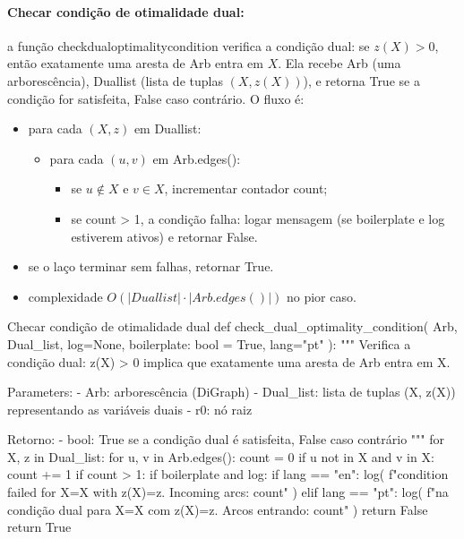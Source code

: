 \documentclass[12pt,a4paper]{article}
\def\texttt#1{#1}%
\def\_{}%
\begin{document}
\paragraph{Checar condição de otimalidade dual:}
    a função \texttt{check\_dual\_optimality\_condition} verifica a condição dual: se \(z(X)>0\), então exatamente uma aresta de \texttt{Arb} entra em \(X\). Ela recebe \texttt{Arb} (uma arborescência), \texttt{Dual\_list} (lista de tuplas \((X,z(X))\)), e retorna True se a condição for satisfeita, False caso contrário. O fluxo é:
\begin{itemize}\setlength{\itemsep}{1pt}
    \item para cada \((X,z)\) em \texttt{Dual\_list}:
    \begin{itemize}\setlength{\itemsep}{1pt}
        \item para cada \((u,v)\) em \texttt{Arb.edges()}:
        \begin{itemize}\setlength{\itemsep}{1pt}
            \item se \(u\notin X\) e \(v\in X\), incrementar contador \texttt{count};
            \item se \texttt{count > 1}, a condição falha: logar mensagem (se \texttt{boilerplate} e \texttt{log} estiverem ativos) e retornar False.
        \end{itemize}
    \end{itemize}
    \item se o laço terminar sem falhas, retornar True.
    \item complexidade \(O(|\texttt{Dual\_list}| \cdot |\texttt{Arb.edges()}|)\) no pior caso.
\end{itemize}

\begin{pybox}{Checar condição de otimalidade dual}
def check_dual_optimality_condition(
    Arb, Dual_list, log=None, boilerplate: bool = True, lang="pt"
):
    """
    Verifica a condição dual: z(X) > 0 implica que exatamente uma aresta de Arb entra em X.

    Parameters:
        - Arb: arborescência (DiGraph)
        - Dual_list: lista de tuplas (X, z(X)) representando as variáveis duais
        - r0: nó raiz

    Retorno:
        - bool: True se a condição dual é satisfeita, False caso contrário
    """
    for X, z in Dual_list:
        for u, v in Arb.edges():
            count = 0
            if u not in X and v in X:
                count += 1
                if count > 1:
                    if boilerplate and log:
                        if lang == "en":
                            log(
                                f"\nDual condition failed for X={X} with z(X)={z}. Incoming arcs: {count}"
                            )
                        elif lang == "pt":
                            log(
                                f"\nFalha na condição dual para X={X} com z(X)={z}. Arcos entrando: {count}"
                            )
                    return False
    return True    

\end{pybox}
\end{document}
